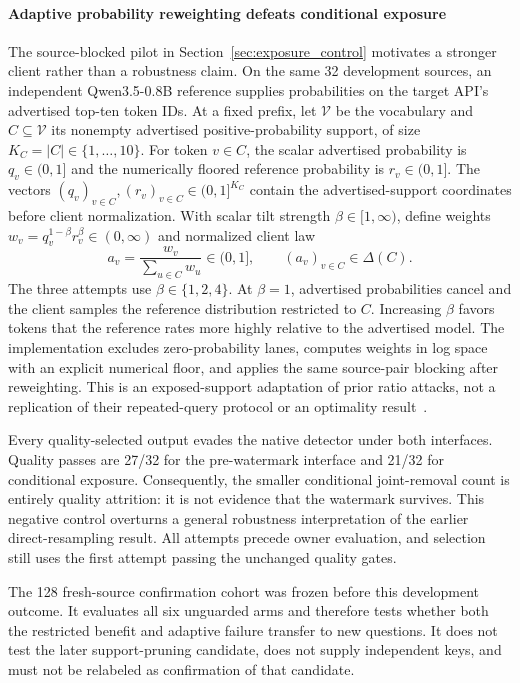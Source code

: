 \paragraph{Adaptive probability reweighting defeats conditional exposure}
\label{sec:ratio_failure}
The source-blocked pilot in Section~\ref{sec:exposure_control} motivates a stronger client rather than a robustness claim. On the same 32 development sources, an independent Qwen3.5-0.8B reference supplies probabilities on the target API's advertised top-ten token IDs. At a fixed prefix, let $\mathcal V$ be the vocabulary and $C\subseteq\mathcal V$ its nonempty advertised positive-probability support, of size $K_C=|C|\in\{1,\ldots,10\}$. For token $v\in C$, the scalar advertised probability is $q_v\in(0,1]$ and the numerically floored reference probability is $r_v\in(0,1]$. The vectors $(q_v)_{v\in C},(r_v)_{v\in C}\in(0,1]^{K_C}$ contain the advertised-support coordinates before client normalization. With scalar tilt strength $\beta\in[1,\infty)$, define weights $w_v=q_v^{1-\beta}r_v^\beta\in(0,\infty)$ and normalized client law
\begin{equation}
\label{eq:adaptive-ratio-law}
 a_v=\frac{w_v}{\sum_{u\in C}w_u}\in(0,1],\qquad
 (a_v)_{v\in C}\in\Delta(C).
\end{equation}
The three attempts use $\beta\in\{1,2,4\}$. At $\beta=1$, advertised probabilities cancel and the client samples the reference distribution restricted to $C$. Increasing $\beta$ favors tokens that the reference rates more highly relative to the advertised model. The implementation excludes zero-probability lanes, computes weights in log space with an explicit numerical floor, and applies the same source-pair blocking after reweighting. This is an exposed-support adaptation of prior ratio attacks, not a replication of their repeated-query protocol or an optimality result~\citep{omidi2026unified}.



Every quality-selected output evades the native detector under both interfaces. Quality passes are 27/32 for the pre-watermark interface and 21/32 for conditional exposure. Consequently, the smaller conditional joint-removal count is entirely quality attrition: it is not evidence that the watermark survives. This negative control overturns a general robustness interpretation of the earlier direct-resampling result. All attempts precede owner evaluation, and selection still uses the first attempt passing the unchanged quality gates.

The 128 fresh-source confirmation cohort was frozen before this development outcome. It evaluates all six unguarded arms and therefore tests whether both the restricted benefit and adaptive failure transfer to new questions. It does not test the later support-pruning candidate, does not supply independent keys, and must not be relabeled as confirmation of that candidate.
